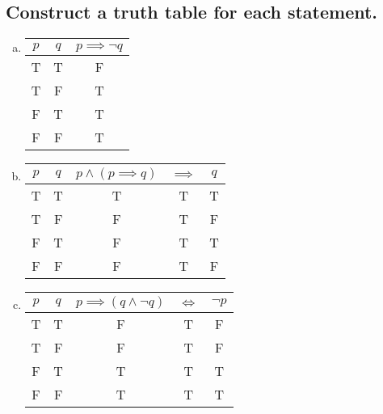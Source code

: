 \documentclass[12pt]{scrartcl} %
\begin{document}
\subsection{Construct a truth table for each statement.}
\begin{enumerate}[(a)]
	\item 
		\begin{tabular}{*{2}{c}|*{1}{c}}$p$&$q$&$p \implies \neg q$\\
		\hline
		T&T&F\\
		T&F&T\\
		F&T&T\\
		F&F&T\\
		\end{tabular}
	\item
		\begin{tabular}{*{2}{c}|*{3}{c}}$p$&$q$&$p \land (p \implies q)$&$\implies$&$q$\\
		\hline
		T&T&T&T&T\\
		T&F&F&T&F\\
		F&T&F&T&T\\
		F&F&F&T&F\\
		\end{tabular}
		
	\item
		\begin{tabular}{*{2}{c}|*{3}{c}}$p$&$q$&$p \implies (q \land \neg q)$&$\iff$&$\neg p$\\
		\hline
		T&T&F&T&F\\
		T&F&F&T&F\\
		F&T&T&T&T\\
		F&F&T&T&T\\
		\end{tabular}
\end{enumerate}
\end{document}
